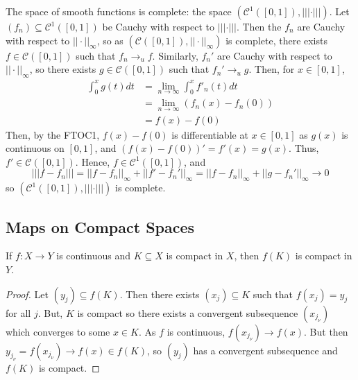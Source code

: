 \begin{eg}
    The space of smooth functions is complete: the space $(\mathcal{C}^1([0,1]), |||\cdot|||)$. Let $(f_n) \subseteq \mathcal{C}^1([0,1])$ be Cauchy with respect to $|||\cdot|||$. Then the $f_n$ are Cauchy with respect to $||\cdot||_{\infty}$, so as $(\mathcal{C}([0,1]),||\cdot||_{\infty})$ is complete, there exists $f \in \mathcal{C}([0,1])$ such that $f_n\rightarrow_uf$. Similarly, $f_n'$ are Cauchy with respect to $||\cdot||_{\infty}$, so there exists $g \in \mathcal{C}([0,1])$ such that $f_n'\rightarrow_ug$. Then, for $x \in [0,1]$, \begin{align*}
        \int_0^xg(t)dt &= \lim\limits_{n\rightarrow \infty}\int_0^xf'_n(t)dt \tag{by uniform convergence} \\
        &= \lim\limits_{n\rightarrow \infty}(f_n(x)-f_n(0)) \tag{by FTOC2} \\
        &= f(x) - f(0) \tag{by pointwise convergence}
    \end{align*}
    Then, by the FTOC1, $f(x)-f(0)$ is differentiable at $x \in [0,1]$ as $g(x)$ is continuous on $[0,1]$, and $(f(x)-f(0))' = f'(x) = g(x)$. Thus, $f' \in \mathcal{C}([0,1])$. Hence, $f \in \mathcal{C}^1([0,1])$, and $$|||f-f_n||| = ||f-f_n||_{\infty} + ||f'-f_n'||_{\infty} = ||f-f_n||_{\infty} + ||g-f_n'||_{\infty}\rightarrow 0$$ so $(\mathcal{C}^1([0,1]),|||\cdot|||)$ is complete.
\end{eg}






\subsection{Maps on Compact Spaces}

\begin{prop}\label{prop:3.1.2}
    If $f:X\rightarrow Y$ is continuous and $K \subseteq X$ is compact in $X$, then $f(K)$ is compact in $Y$.
\end{prop}
\begin{proof}
    Let $(y_j) \subseteq f(K)$. Then there exists $(x_j) \subseteq K$ such that $f(x_j) = y_j$ for all $j$. But, $K$ is compact so there exists a convergent subsequence $(x_{j_{\nu}})$ which converges to some $x \in K$. As $f$ is continuous, $f(x_{j_{\nu}})\rightarrow f(x)$. But then $y_{j_{\nu}} = f(x_{j_{\nu}})\rightarrow f(x) \in f(K)$, so $(y_j)$ has a convergent subsequence and $f(K)$ is compact.
\end{proof}

